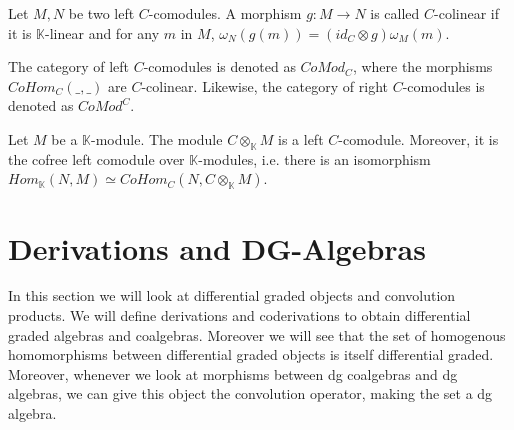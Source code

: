 \documentclass[../thesis.tex]{subfiles}
\begin{document}
\begin{definition}[Comodules]
\begin{center}
                \end{center}
            \end{definition}

            \begin{definition}
                Let $M,N$ be two left $C$-comodules. A morphism $g:M\rightarrow N$ is called $C$-colinear if it is $\mathbb{K}$-linear and for any $m$ in $M$, $\omega_N(g(m)) = (id_C\otimes g)\omega_M(m)$.
            \end{definition}

            The category of left $C$-comodules is denoted as $CoMod_C$, where the morphisms $CoHom_C(\_,\_)$ are $C$-colinear. Likewise, the category of right $C$-comodules is denoted as $CoMod^C$.

            \begin{proposition}
                Let $M$ be a $\mathbb{K}$-module. The module $C\otimes_{\mathbb{K}}M$ is a left $C$-comodule. Moreover, it is the cofree left comodule over $\mathbb{K}$-modules, i.e. there is an isomorphism $Hom_{\mathbb{K}}(N,M)\simeq CoHom_C(N,C\otimes_{\mathbb{K}}M)$. 
            \end{proposition}

    \section{Derivations and DG-Algebras}
            In this section we will look at differential graded objects and convolution products. We will define derivations and coderivations to obtain differential graded algebras and coalgebras. Moreover we will see that the set of homogenous homomorphisms between differential graded objects is itself differential graded. Moreover, whenever we look at morphisms between dg coalgebras and dg algebras, we can give this object the convolution operator, making the set a dg algebra.
\end{document}
